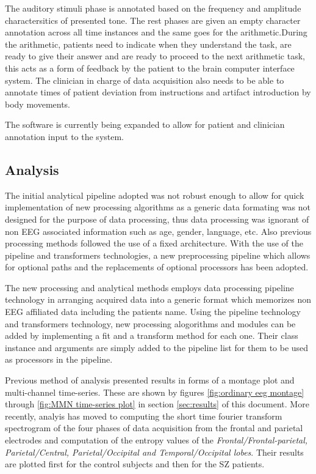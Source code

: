 \documentclass[conference]{IEEEconf}
\begin{document}
The auditory stimuli phase is annotated based on the frequency and amplitude charactersitics of presented tone. The rest phases are given an empty
character annotation across all time instances and the same goes for the arithmetic.During the arithmetic, patients need to indicate when they understand the task,
are ready to give their answer and are ready to proceed to the next arithmetic task, this acts as a form of feedback by the patient to the brain computer interface system. 
The clinician in charge of data acquisition also needs to be able to annotate times of 
patient deviation from instructions and artifact introduction by body movements.

The software is currently being expanded to allow for patient and clinician annotation input to the system.

\subsection{Analysis}
The initial analytical pipeline adopted was not robust enough to allow for quick implementation of new processing algorithms as a generic data formating was not designed 
for the purpose of data processing, thus data processing was ignorant of non EEG associated information such as age, gender, language, etc. Also previous processing
methods followed the use of a fixed architecture. With the use of the pipeline and transformers technologies, a new preprocessing pipeline which allows for optional paths and the replacements of optional processors has 
been adopted.

The new processing and analytical methods employs data processing pipeline technology in arranging acquired data into a generic format which memorizes non EEG affiliated
data including the patients name. Using the pipeline technology and transformers technology, new processing alogorithms and modules can be added by implementing a fit
and a transform method for each one. Their class instance and arguments are simply added to the pipeline list for them to be used as processors in the pipeline.

Previous method of analysis presented results in forms of a montage plot and multi-channel time-series. These are shown by figures \ref{fig:ordinary eeg montage} through \ref{fig:MMN time-series plot} 
in section \ref{sec:results} of this document. More recently, analyis has moved to computing the short time fourier transform spectrogram 
of the four phases of data acquisition from the frontal and parietal electrodes and 
computation of the entropy values of the \textit{Frontal/Frontal-parietal, Parietal/Central, Parietal/Occipital and Temporal/Occipital lobes}.
Their results are plotted first for the control subjects and then for the SZ patients.
\end{document}
